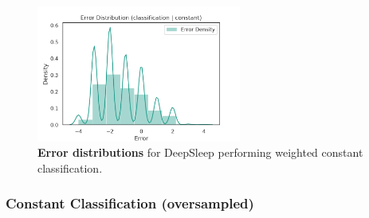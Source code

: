 \documentclass[11pt]{scrartcl}
\begin{document}
\begin{figure}[hbt]
	\centering
	\includegraphics[width=0.6\textwidth]{img/learning/original_physionet_sleepnet_classification_constant_none_weighted_error_distribution.png}
	\caption{\textcolor{viridis5}{\textbf{Error distributions}} for DeepSleep performing weighted constant classification.}
	\label{fig:original_physionet_sleepnet_classification_constant_none_weighted_error_distribution}
\end{figure}

\FloatBarrier



\FloatBarrier
\subsubsection{Constant Classification (oversampled)}
\end{document}
